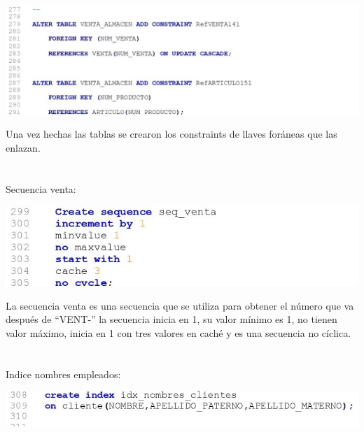 \documentclass[letter,12pt]{article} %
\begin{document}
\begin{center} 
\includegraphics[scale=0.90]{imagenes/DDL10.jpg}
\end{center}
Una vez hechas las tablas se crearon los constraints de llaves foráneas que las enlazan. 
\\\\\\
Secuencia venta:
\begin{center} 
\includegraphics[scale=0.90]{imagenes/DDL11.jpg}
\end{center}
La secuencia venta es una secuencia que se utiliza para obtener el número que va después de “VENT-” la secuencia inicia en 1, su valor mínimo es 1, no tienen valor máximo, inicia en 1 con tres valores en caché y es una secuencia no cíclica.
\\\\\\
Indice nombres empleados:
\begin{center} 
\includegraphics[scale=0.90]{imagenes/DDL12.jpg}
\end{center}
\end{document}
